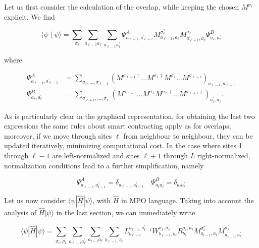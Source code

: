 \documentclass[12pt]{article}
\begin{document}
Let us first consider the calculation of the overlap, while keeping the chosen $M^{\sigma_{\ell}}$ explicit. We find


\begin{equation*}
\langle\psi \mid \psi\rangle=\sum_{\sigma_{\ell}} \sum_{a_{\ell-1} a_{\ell}} \sum_{a_{\ell-1}^{\prime} a_{\ell}^{\prime}} \Psi_{a_{\ell-1}, a_{\ell-1}^{\prime}}^{A} M_{a_{\ell-1}, a_{\ell}}^{\sigma_{\ell}^{*}} M_{a_{\ell-1}^{\prime}, a_{\ell}}^{\sigma_{\ell}} \Psi_{a_{\ell}, a_{\ell}^{\prime}}^{B} \tag{204}
\end{equation*}


where


\begin{align*}
\Psi_{a_{\ell-1}, a_{\ell-1}^{\prime}}^{A} & =\sum_{\sigma_{1}, \ldots, \sigma_{\ell-1}}\left(M^{\sigma_{\ell-1} \dagger} \ldots M^{\sigma_{1} \dagger} M^{\sigma_{1}} \ldots M^{\sigma_{\ell-1}}\right)_{a_{\ell-1}, a_{\ell-1}^{\prime}}  \tag{205}\\
\Psi_{a_{\ell}, a_{\ell}^{\prime}}^{B} & =\sum_{\sigma_{\ell+1}, \ldots, \sigma_{L}}\left(M^{\sigma_{\ell+1}} \ldots M^{\sigma_{L}} M^{\sigma_{L} \dagger} \ldots M^{\sigma_{\ell+1} \dagger}\right)_{a_{\ell}^{\prime}, a_{\ell}} . \tag{206}
\end{align*}


As is particularly clear in the graphical representation, for obtaining the last two expressions the same rules about smart contracting apply as for overlaps; moreover, if we move through sites $\ell$ from neighbour to neighbour, they can be updated iteratively, minimizing computational cost. In the case where sites 1 through $\ell-1$ are left-normalized and sites $\ell+1$ through $L$ right-normalized, normalization conditions lead to a further simplification, namely


\begin{equation*}
\Psi_{a_{\ell-1}, a_{t-1}^{\prime}}^{A}=\delta_{a_{\ell-1}, a_{t-1}^{\prime}} \quad \Psi_{a_{t} a_{\ell}^{\prime}}^{B}=\delta_{a_{t} a_{\ell}^{\prime}} \tag{207}
\end{equation*}


Let us now consider $\langle\psi|\hat{H}| \psi\rangle$, with $\hat{H}$ in MPO language. Taking into account the analysis of $\hat{H}|\psi\rangle$ in the last section, we can immediately write


\begin{equation*}
\langle\psi|\hat{H}| \psi\rangle=\sum_{\sigma_{t}, \sigma_{t}^{\prime}} \sum_{a_{\ell-1}^{\prime} a_{\ell}^{\prime}} \sum_{a_{t-1} a_{\ell}} \sum_{b_{\ell-1}, b_{\ell}} L_{b_{\ell-1}}^{a_{t-1}, a_{t-1}^{\prime}} W_{b_{\ell-1}, b_{\ell}}^{\sigma_{t}, \sigma_{\ell}^{\prime}} R_{b_{\ell}}^{a_{t}, a_{\ell}^{\prime}} M_{a_{t-1}, a_{\ell}}^{\sigma_{t}^{*}} M_{a_{t-1}^{\prime}, a_{\ell}^{\prime}}^{\sigma_{\ell}^{\prime}} \tag{208}
\end{equation*}
\end{document}
